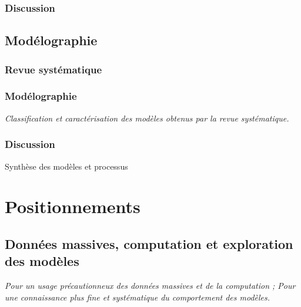 \subsubsection{Discussion}










\subsection{Modélographie}

\subsubsection{Revue systématique}


\subsubsection{Modélographie}

\textit{Classification et caractérisation des modèles obtenus par la revue systématique.}


\subsubsection{Discussion}

Synthèse des modèles et processus


\section{Positionnements}



\subsection{Données massives, computation et exploration des modèles}

\textit{Pour un usage précautionneux des données massives et de la computation ; Pour une connaissance plus fine et systématique du comportement des modèles.}


